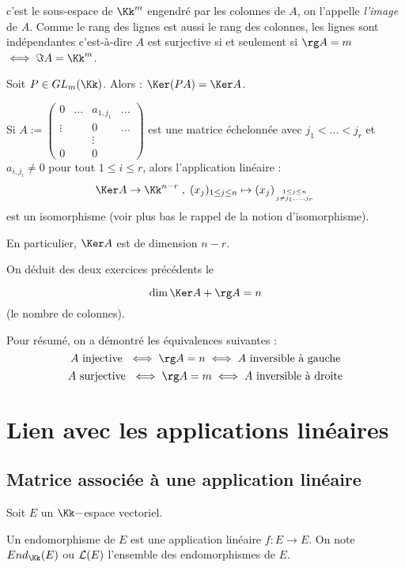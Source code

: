 \documentclass[class=report,crop=false]{standalone}
\newcommand{\GL}{GL}
\newcommand{\End}{End}
\begin{document}
c'est le sous-espace de $\Kk^m$ engendré par les colonnes de $A$, on l'appelle {\it l'image} de $A$. Comme le rang des lignes est aussi le rang des colonnes, les lignes sont indépendantes c'est-à-dire $A$ est surjective si et seulement si $\rg A = m$ $\iff \Im A = \Kk^m$. 


\begin{exercicecours}
Soit $P \in \GL_m(\Kk)$. Alors : $\Ker (PA) = \Ker A$.
\end{exercicecours}

\begin{exercicecours}

Si $A := \left(\begin{array}{cccc}
0 & ... & a_{1,j_1}&...\\
\vdots & &0&...\\
&&\vdots&\\
0&&0&
\end{array}
\right)$  est une matrice échelonnée avec $j_1 < ...<j_r$ et  $a_{i,j_i}\neq 0$ pour tout $1\le i \le r$, alors l'application linéaire :
\[\Ker A \to \Kk^{n-r}  \;,\;(x_j)_{1 \le j \le n} \mapsto (x_j)_{1 \le j \le n \atop j \neq j_1,...,j_r}\]
 est un isomorphisme (voir plus bas le rappel de la notion d'isomorphisme).

En particulier, $\Ker A$ est de dimension $n -r$.
\end{exercicecours}

On déduit des deux exercices précédents le 
\begin{theoreme}[du rang]
\[\dim \Ker A + \rg A = n\]
(le nombre de colonnes).
\end{theoreme}


Pour résumé, on a démontré les équivalences suivantes :
\[A \mbox{ injective }\iff \rg A = n \iff A \mbox{ inversible à gauche}\]
\[A\mbox{ surjective }\iff \rg A = m \iff A \mbox{ inversible à droite}\]

\section{Lien avec les applications linéaires}


\subsection{
 Matrice associée à une application linéaire}

Soit $E$ un $\Kk-$espace vectoriel. 
\begin{definition}
Un endomorphisme de $E$ est une application linéaire $f : E \to E$. On note $\End_\Kk(E)$ ou ${\cal L}(E)$ l'ensemble des endomorphismes de $E$.
\end{definition}
\end{document}
